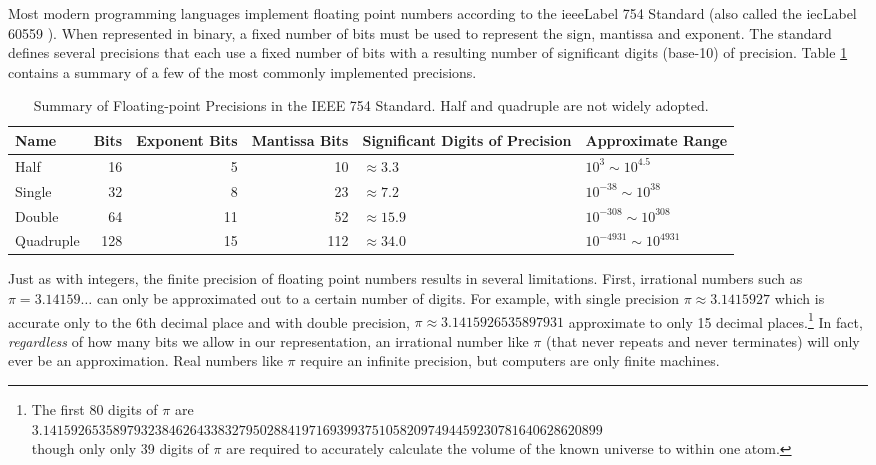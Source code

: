 Most modern programming languages implement floating point numbers according to the
\gls{ieeeLabel} 754 Standard \cite{P754:2008:ISF} (also called the \gls{iecLabel} 60559 \cite{IEC:1989:IBF}).
When represented in binary, a fixed number of bits must be used to represent the sign, mantissa
and exponent.  The standard defines several precisions that each use a fixed number of bits with
a resulting number of significant digits (base-10) of precision.  Table \ref{table:ieee754Summary}
contains a summary of a few of the most commonly implemented precisions.

\begin{table}
\centering
\begin{tabular}{l|r|r|r|p{3cm}|p{3cm}}
Name & Bits & Exponent Bits & Mantissa Bits & Significant Digits of Precision & Approximate Range\\
\hline\hline
Half & 16 & 5 & 10 & $\approx 3.3$ & $10^{3} \sim 10^{4.5}$\\
Single & 32 & 8 &  23 & $\approx 7.2$ & $10^{-38} \sim 10^{38}$\\
Double & 64 & 11 & 52 & $\approx 15.9$ & $10^{-308} \sim 10^{308}$ \\
Quadruple & 128 & 15 & 112 & $\approx 34.0$ & $10^{-4931} \sim 10^{4931}$ \\
\end{tabular}
\caption[Summary of Floating-point Precisions in the IEEE 754 Standard]{Summary of Floating-point Precisions in the IEEE 754 Standard.  Half and
quadruple are not widely adopted.}
\label{table:ieee754Summary}
\end{table}

Just as with integers, the finite precision of floating point numbers results in 
several limitations.  First, irrational numbers such as $\pi = 3.14159\ldots$ 
can only be approximated out to a certain number of digits.  For example, 
with single precision $\pi \approx 3.1415927$ which is accurate only to the 
6th decimal place and with double precision, $\pi \approx 3.1415926535897931$
approximate to only 15 decimal places.\footnote{The first 80 digits of $\pi$ are\\ 
$3.14159265358979323846264338327950288419716939937510582097494459230781640628620899$\\ 
though only only 39 digits of $\pi$ are required to accurately calculate the volume of the known universe to within one atom.}
In fact, \emph{regardless} of how many bits we allow in our representation, 
an irrational number like $\pi$ (that never repeats and never terminates) will
only ever be an approximation.  Real numbers like $\pi$ require an infinite
precision, but computers are only finite machines.  


